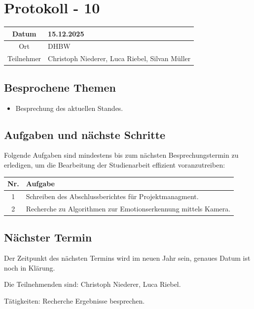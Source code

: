 \chapter{Protokoll - 10}

\begin{table}[H]
    \centering
    \begin{tabular}{|c|l|}
        \hline
        Datum& 15.12.2025 \\
        \hline
        Ort& DHBW\\
        \hline
        Teilnehmer& Christoph Niederer, Luca Riebel, Silvan Müller\\
        \hline
    \end{tabular}
\end{table}

\section{Besprochene Themen}
\begin{itemize}
    \item Besprechung des aktuellen Standes.
\end{itemize}

\section{Aufgaben und nächste Schritte}
Folgende Aufgaben sind mindestens bis zum nächsten Besprechungstermin zu erledigen, um die Bearbeitung der Studienarbeit effizient voranzutreiben:

\begin{table}[H]
    \centering
    \begin{tabular}{|c|p{12cm}|}
        \hline
        \textbf{Nr.} & \textbf{Aufgabe}\\
        \hline
        1 & Schreiben des Abschlussberichtes für Projektmanagment. \\
        2 & Recherche zu Algorithmen zur Emotionserkennung mittels Kamera. \\
        \hline
    \end{tabular}
\end{table}

\section{Nächster Termin}
Der Zeitpunkt des nächsten Termins wird im neuen Jahr sein, genaues Datum ist noch in Klärung.

Die Teilnehmenden sind: Christoph Niederer, Luca Riebel.

Tätigkeiten: Recherche Ergebnisse besprechen.
